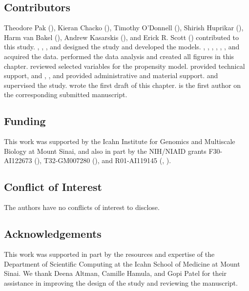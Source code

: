 \subsection*{Contributors}

Theodore Pak (), Kieran Chacko (), Timothy O'Donnell (), Shirish Huprikar (), Harm van Bakel (), Andrew Kasarskis (), and Erick R. Scott () contributed to this study. , , , and  designed the study and developed the models. , , , , , , and  acquired the data.  performed the data analysis and created all figures in this chapter.  reviewed selected variables for the propensity model.  provided technical support, and , , and  provided administrative and material support.  and  supervised the study.  wrote the first draft of this chapter.  is the first author on the corresponding submitted manuscript.

\subsection*{Funding}

This work was supported by the Icahn Institute for Genomics and Multiscale Biology at Mount Sinai, and also in part by the NIH/NIAID grants F30-AI122673 (), T32-GM007280 (), and R01-AI119145 (, ).

\subsection*{Conflict of Interest}

The authors have no conflicts of interest to disclose.

\subsection*{Acknowledgements}

This work was supported in part by the resources and expertise of the Department of Scientific Computing at the Icahn School of Medicine at Mount Sinai. We thank Deena Altman, Camille Hamula, and Gopi Patel for their assistance in improving the design of the study and reviewing the manuscript.